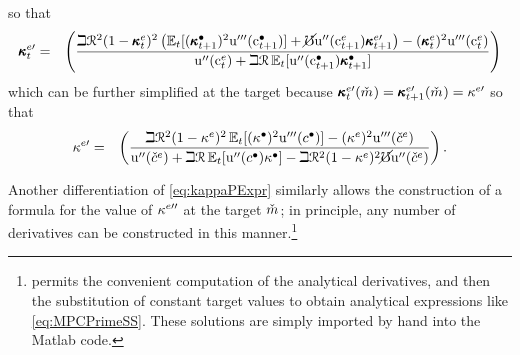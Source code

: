 \message{ !name(TractableBufferStock.tex)}\documentclass{handout}
\begin{document}
so that
\begin{eqnarray}
\pmb{\kappa}^{e\prime}_{t}   & = & \left(\frac{\beth \mathcal{R}^{2} (1-\pmb{\kappa}^{e}_{t})^{2} \left( \operatorname{\mathbb{E}}_{t}[(\pmb{\kappa}_{t+1}^{\bullet})^{2}{\mathrm{u}^{\prime\prime\prime}}(\mathrm{c}^{\bullet}_{t+1})] +\cancel{\mho} {\mathrm{u}^{\prime\prime}}(\mathrm{c}^{e}_{t+1}) \pmb{\kappa}^{e \prime}_{t+1}\right)-(\pmb{\kappa}^{e}_{t})^{2} {\mathrm{u}^{\prime\prime\prime}}(\mathrm{c}^{e}_{t})}{{\mathrm{u}^{\prime\prime}}(\mathrm{c}^{e}_{t})+\beth \mathcal{R} \operatorname{\mathbb{E}}_{t}[{\mathrm{u}^{\prime\prime}}(\mathrm{c}^{\bullet}_{t+1})\pmb{\kappa}^{\bullet}_{t+1}]  }\right) \nonumber \\ \label{eq:kappaPReverse}
\end{eqnarray}
which can be further simplified at the target because $\MPCFunc^{e \prime}_{t}(\mTarg^{\null}) = \MPCFunc^{e \prime}_{t+1}(\mTarg^{\null}) = \MPC^{e \prime}$ so that
\begin{eqnarray}
\kappa^{e\prime} & = & \left(\frac{\beth \mathcal{R}^{2} (1-\kappa^{e})^{2}\operatorname{\mathbb{E}}_{t}[(\kappa^{\bullet})^{2} {\mathrm{u}^{\prime\prime\prime}}(c^{\bullet})] -(\kappa^{e})^{2} {\mathrm{u}^{\prime\prime\prime}}(\check{c}^{e})}{{\mathrm{u}^{\prime\prime}}(\check{c}^{e}) + \beth \mathcal{R} \operatorname{\mathbb{E}}_{t}[{\mathrm{u}^{\prime\prime}}(c^{\bullet})\kappa^{\bullet}]- \beth \mathcal{R}^{2} (1-\kappa^{e})^{2}\cancel{\mho} {\mathrm{u}^{\prime\prime}}(\check{c}^{e})}\right) \label{eq:MPCPrimeSS}
.
\end{eqnarray}

Another differentiation of \eqref{eq:kappaPExpr} similarly allows the construction of a formula for the value of $\kappa^{e \prime\prime}$ at the target $\mTarg^{\null}$; in principle, any number of derivatives can be 
constructed in this manner.\footnote{\Mma permits the convenient computation of the analytical derivatives, and then the substitution of constant target values to obtain analytical expressions like \eqref{eq:MPCPrimeSS}.  These solutions are simply imported by hand into the Matlab code.}
\end{document}

